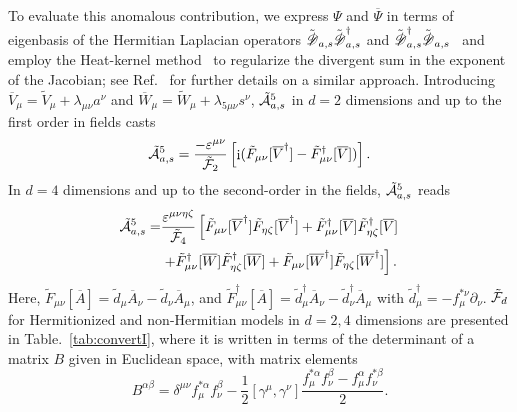 \documentclass[prl,aps,showpacs,twocolumn,preprintnumbers,
amsmath,amssymb,superscriptaddress,longbibliography]{revtex4-1}
\renewcommand{\i}{\mathop{\mathrm{i}}}
\newcommand{\scr}[1]{\mathscr #1}
\begin{document}
To evaluate this anomalous contribution, we express $\Psi$ and $\overline{\Psi}$ in terms of eigenbasis of the Hermitian Laplacian operators 
$\tilde{\slashed{\scr{D}}}_{a,s} \tilde{\slashed{\scr{D}}}^{\dagger}_{a,s}$ and
$\tilde{\slashed{\scr{D}}}^{\dagger}_{a,s} \tilde{\slashed{\scr{D}}}_{a,s}$~\cite{Kikuchi1992, Rylands2021} 
and employ the Heat-kernel method~\cite{Nakahara1990, Bertlmann1996, Fujikawa2004} to regularize the divergent sum in the exponent of the Jacobian; see Ref.~\cite{Sayyad2022ca} for further details on a similar approach. Introducing $\overline{V}_{\mu} = \tilde{V}_{\mu} + \lambda_{\mu \nu} a^{\nu}$ and $\overline{W}_{\mu}=\tilde{W}_{\mu} + \lambda_{5\mu \nu} s^{\nu}$, $\tilde{\cal A}_{a,s}^{5}$ in $d=2$ dimensions and up to the first order in fields casts
 \begin{equation}
 \tilde{{\cal A}}_{a,s}^{5}  =\frac{ -\varepsilon^{\mu \nu} }{\tilde{\cal F}_{2}} 
       \left[
\i (
  \tilde{F}_{\mu \nu}[ \overline{V}^{\dagger}] 
         -
  \tilde{F}^{\dagger}_{\mu \nu}[ \overline{V}] 
  )
 \right]
.\label{eq:A5_1p1_mt_Vbar} 
 \end{equation}
 In $d=4$ dimensions and up to the second-order in the fields, $\tilde{\cal A}_{a,s}^{5}$ reads
    \begin{align}
\tilde{\cal A}_{a,s}^{5}
 =&
   \frac{   \varepsilon^{\mu \nu \eta \zeta}}{\tilde{\cal F}_{4}} 
     \left[
\tilde{F}_{\mu \nu}[ \overline{V}^{\dagger}] 
\tilde{F}_{\eta \zeta}[ \overline{V}^{\dagger}] 
+
 \tilde{F}^{\dagger}_{\mu \nu}[ \overline{V}] 
\tilde{F}^{\dagger}_{\eta \zeta}[ \overline{V}] 
  \right.
    \nonumber \\
  &
  \left.
+
\tilde{F}^{\dagger}_{\mu \nu} [\overline{W}]
  \tilde{F}^{\dagger}_{\eta\zeta} [\overline{W}]
  +
 \tilde{F}_{\mu \nu} [\overline{W}^{\dagger}]
 \tilde{F}_{\eta \zeta} [\overline{W}^{\dagger}]
 \right]
.\label{eq:A5_3p1_Vbar}
\end{align}
Here, $\tilde{F}_{\mu \nu} [\overline{A}]= \tilde{d}_{\mu} \overline{A}_{\nu}- \tilde{d}_{\nu} \overline{A}_{\mu} $, and $\tilde{F}^{\dagger}_{\mu \nu} [\overline{A}]= \tilde{d}^{\dagger}_{\mu} \overline{A}_{\nu}- \tilde{d}^{\dagger}_{\nu} \overline{A}_{\mu} $ with $\tilde{d}_{\mu}^{\dagger} = - f^{ * \nu }_{\mu} \partial_{\nu}$. $\tilde{{\cal F}}_{d}$ for Hermitionized and non-Hermitian models in $d=2,4$ dimensions are presented in Table.~\ref{tab:convertI}, where it is written in terms of the determinant of a matrix $B$ given in Euclidean space, with matrix elements
  \begin{equation}
 B^{\alpha \beta}= \delta^{\mu \nu}
 f_{\mu}^{*\alpha} f_{\nu}^{\beta}
 -
  \frac{1}{2} [ \gamma^{ \mu},  \gamma^{ \nu}]
\frac{f_{\mu}^{*\alpha} f_{\nu}^{\beta} 
- f_{\mu}^{\alpha} f_{\nu}^{*\beta}   
}{2}. \label{eq:constB}
 \end{equation}
\end{document}
